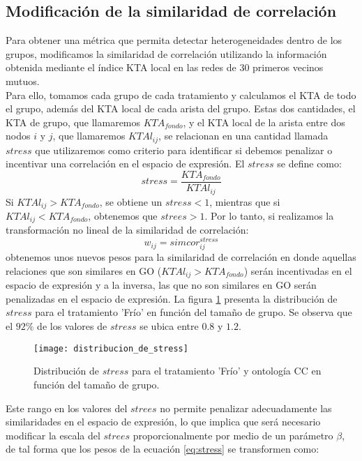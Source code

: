 \subsection{Modificación de la similaridad de correlación}
Para obtener una métrica que permita detectar heterogeneidades dentro de los grupos, modificamos la similaridad de correlación utilizando la información obtenida mediante el índice KTA local en las redes de 30 primeros vecinos mutuos.\\
Para ello, tomamos cada grupo de cada tratamiento y calculamos el KTA de todo el grupo, además del KTA local de cada arista del grupo. Estas dos cantidades, el KTA de grupo, que llamaremos $KTA_{fondo}$, y el KTA local de la arista entre dos nodos $i$ y $j$, que llamaremos $KTAl_{ij}$, se relacionan en una cantidad llamada $stress$ que utilizaremos como criterio para identificar si debemos penalizar o incentivar una correlación en el espacio de expresión. El $stress$ se define como:
\begin{equation}
	stress = \frac{KTA_{fondo}}{KTAl_{ij}}
\end{equation}
Si $KTAl_{ij} > KTA_{fondo}$, se obtiene un $stress < 1$, mientras que si $KTAl_{ij} < KTA_{fondo}$, obtenemos que $strees > 1$. Por lo tanto, si realizamos la transformación no lineal de la similaridad de correlación:
\begin{equation}
	w_{ij} = simcor_{ij}^{stress}
	\label{eq:stress}
\end{equation}
obtenemos unos nuevos pesos para la similaridad de correlación en donde aquellas relaciones que son similares en GO ($KTAl_{ij} > KTA_{fondo}$) serán incentivadas en el espacio de expresión y a la inversa, las que no son similares en GO serán penalizadas en el espacio de expresión. La figura \ref{fig:distribucion_de_stress} presenta la distribución de $stress$ para el tratamiento 'Frío' en función del tamaño de grupo. Se observa que el $92\%$ de los valores de $stress$ se ubica entre $0.8$ y $1.2$. 
\begin{figure}[H]
\centering
\texttt{[image: distribucion\_de\_stress]}
\caption{Distribución de $stress$ para el tratamiento 'Frío' y ontología CC en función del tamaño de grupo.}
\label{fig:distribucion_de_stress}
\end{figure}
Este rango en los valores del $strees$ no permite penalizar adecuadamente las similaridades en el espacio de expresión, lo que implica que será necesario modificar la escala del $strees$ proporcionalmente por medio de un parámetro $\beta$, de tal forma que los pesos de la ecuación \ref{eq:stress} se transformen como:
